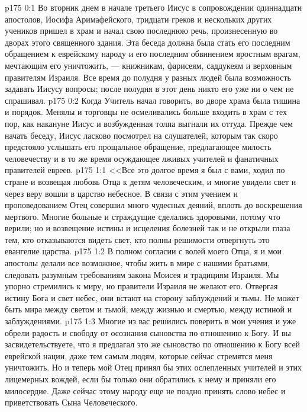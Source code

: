 \vs p175 0:1 Во вторник днем в начале третьего Иисус в сопровождении одиннадцати апостолов, Иосифа Аримафейского, тридцати греков и нескольких других учеников пришел в храм и начал свою последнюю речь, произнесенную во дворах этого священного здания. Эта беседа должна была стать его последним обращением к еврейскому народу и его последним обвинением яростным врагам, мечтающим его уничтожить, --- книжникам, фарисеям, саддукеям и верховным правителям Израиля. Все время до полудня у разных людей была возможность задавать Иисусу вопросы; после полудня в этот день никто его уже ни о чем не спрашивал.
\vs p175 0:2 Когда Учитель начал говорить, во дворе храма была тишина и порядок. Менялы и торговцы не осмеливались больше входить в храм с тех пор, как накануне Иисус и возбужденная толпа выгнали их оттуда. Прежде чем начать беседу, Иисус ласково посмотрел на слушателей, которым так скоро предстояло услышать его прощальное обращение, предлагающее милость человечеству и в то же время осуждающее лживых учителей и фанатичных правителей евреев.
\vs p175 1:1 <<Все это долгое время я был с вами, ходил по стране и возвещая любовь Отца к детям человеческим, и многие увидели свет и через веру вошли в царство небесное. В связи с этим учением и проповедованием Отец совершил много чудесных деяний, вплоть до воскрешения мертвого. Многие больные и страждущие сделались здоровыми, потому что верили; но и возвещение истины и исцеления болезней так и не открыли глаза тем, кто отказываются видеть свет, кто полны решимости отвергнуть это евангелие царства.
\vs p175 1:2 В полном согласии с волей моего Отца, я и мои апостолы делали все возможное, чтобы жить в мире с нашими братьями, следовать разумным требованиям закона Моисея и традициям Израиля. Мы упорно стремились к миру, но правители Израиля не желают его. Отвергая истину Бога и свет небес, они встают на сторону заблуждений и тьмы. Не может быть мира между светом и тьмой, между жизнью и смертью, между истиной и заблуждениями.
\vs p175 1:3 Многие из вас решились поверить в мои учения и уже обрели радость и свободу от осознания сыновства по отношению к Богу. И вы засвидетельствуете, что я предлагал это же сыновство по отношению к Богу всей еврейской нации, даже тем самым людям, которые сейчас стремятся меня уничтожить. Но и теперь мой Отец принял бы этих ослепленных учителей и этих лицемерных вождей, если бы только они обратились к нему и приняли его милосердие. Даже сейчас этому народу еще не поздно принять слово небес и приветствовать Сына Человеческого.
